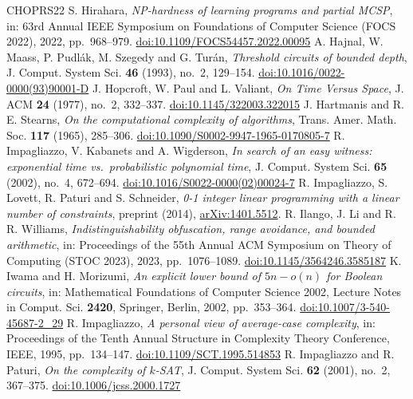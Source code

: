 \documentclass[11pt,reqno]{amsart}
\numberwithin{equation}{section}
\theoremstyle{plain}
\theoremstyle{definition}
\theoremstyle{remark}
\begin{document}
\begin{thebibliography}{CHOPRS22}
 S. Hirahara, \emph{NP-hardness of learning programs and partial MCSP}, in: 63rd Annual IEEE Symposium on Foundations of Computer Science (FOCS 2022), 2022, pp.~968--979. \href{https://doi.org/10.1109/FOCS54457.2022.00095}{doi:10.1109/FOCS54457.2022.00095}
 A. Hajnal, W. Maass, P. Pudl{\'a}k, M. Szegedy and G. Tur{\'a}n, \emph{Threshold circuits of bounded depth}, J. Comput. System Sci. \textbf{46} (1993), no.~2, 129--154. \href{https://doi.org/10.1016/0022-0000(93)90001-D}{doi:10.1016/0022-0000(93)90001-D}
 J. Hopcroft, W. Paul and L. Valiant, \emph{On Time Versus Space}, J. ACM \textbf{24} (1977), no.~2, 332--337. \href{https://doi.org/10.1145/322003.322015}{doi:10.1145/322003.322015}
 J. Hartmanis and R. E. Stearns, \emph{On the computational complexity of algorithms}, Trans. Amer. Math. Soc. \textbf{117} (1965), 285--306. \href{https://doi.org/10.1090/S0002-9947-1965-0170805-7}{doi:10.1090/S0002-9947-1965-0170805-7}
 R. Impagliazzo, V. Kabanets and A. Wigderson, \emph{In search of an easy witness: exponential time vs.\ probabilistic polynomial time}, J. Comput. System Sci. \textbf{65} (2002), no.~4, 672--694. \href{https://doi.org/10.1016/S0022-0000(02)00024-7}{doi:10.1016/S0022-0000(02)00024-7}
 R. Impagliazzo, S. Lovett, R. Paturi and S. Schneider, \emph{0-1 integer linear programming with a linear number of constraints}, preprint (2014), \href{https://arxiv.org/abs/1401.5512}{arXiv:1401.5512}.
 R. Ilango, J. Li and R. R. Williams, \emph{Indistinguishability obfuscation, range avoidance, and bounded arithmetic}, in: Proceedings of the 55th Annual ACM Symposium on Theory of Computing (STOC 2023), 2023, pp.~1076--1089. \href{https://doi.org/10.1145/3564246.3585187}{doi:10.1145/3564246.3585187}
 K. Iwama and H. Morizumi, \emph{An explicit lower bound of $5n-o(n)$ for Boolean circuits}, in: Mathematical Foundations of Computer Science 2002, Lecture Notes in Comput. Sci. \textbf{2420}, Springer, Berlin, 2002, pp.~353--364. \href{https://doi.org/10.1007/3-540-45687-2_29}{doi:10.1007/3-540-45687-2\_29}
 R. Impagliazzo, \emph{A personal view of average-case complexity}, in: Proceedings of the Tenth Annual Structure in Complexity Theory Conference, IEEE, 1995, pp.~134--147. \href{https://doi.org/10.1109/SCT.1995.514853}{doi:10.1109/SCT.1995.514853}
 R. Impagliazzo and R. Paturi, \emph{On the complexity of $k$-SAT}, J. Comput. System Sci. \textbf{62} (2001), no.~2, 367--375. \href{https://doi.org/10.1006/jcss.2000.1727}{doi:10.1006/jcss.2000.1727}

\end{thebibliography}
\end{document}
